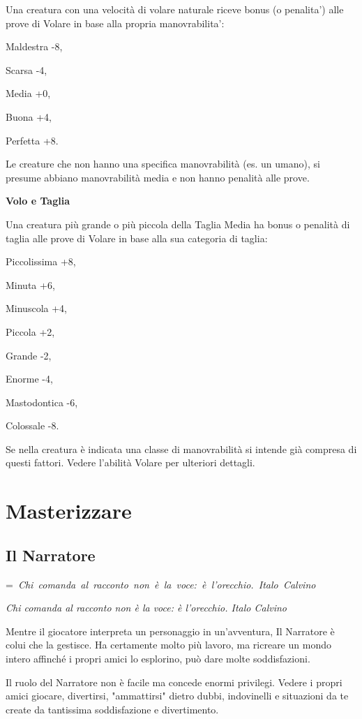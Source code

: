 \documentclass[a4paper,11pt,twoside,openany]{book}
\makeatletter
\newcommand{\mybox}[1]{%
	\setbox0=\hbox{#1}%
	\setlength{\@tempdima}{\dimexpr\wd0+13pt}%
	\begin{tcolorbox}[boxrule=0.5pt,arc=4pt, breakable,enhanced,
		left=6pt,right=6pt,top=6pt,bottom=6pt,boxsep=0pt,width=\@tempdima]
		#1
	\end{tcolorbox}
}
\makeatother
\begin{document}
{Una creatura con una velocità di volare naturale riceve bonus (o penalita') alle prove di Volare in base alla propria manovrabilita':

Maldestra -8,

Scarsa -4,

Media +0,

Buona +4,

Perfetta +8.

Le creature che non hanno una specifica manovrabilità (es. un umano), si presume abbiano manovrabilità media e non hanno penalità alle
prove.

\textbf{Volo e Taglia}

Una creatura più grande o più piccola della Taglia Media ha bonus o penalità di taglia alle prove di Volare in base alla sua categoria di taglia:

Piccolissima +8,

Minuta +6,

Minuscola +4,

Piccola +2,

Grande -2,

Enorme -4,

Mastodontica -6,

Colossale -8.

Se nella creatura è indicata una classe di manovrabilità si intende già compresa di questi fattori. Vedere l'abilità Volare per ulteriori dettagli.

\pagebreak

\section{Masterizzare}

\label{masterizzare}


\subsection{Il Narratore}

\mybox{\textit{
{Chi comanda al racconto non è la voce: è l'orecchio. Italo Calvino}
}}\medskip


\label{il-narratore}

Mentre il giocatore interpreta un personaggio in un'avventura, Il Narratore è colui che la gestisce. Ha certamente molto più lavoro, ma ricreare un mondo intero affinché i propri amici lo esplorino, può dare molte soddisfazioni.

Il ruolo del Narratore non è facile ma concede enormi privilegi. Vedere i propri amici giocare, divertirsi, "ammattirsi" dietro dubbi, indovinelli e situazioni da te create da tantissima soddisfazione e divertimento.

}
\end{document}
